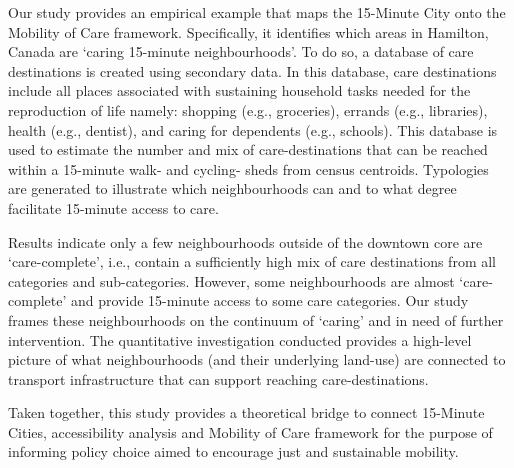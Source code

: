 \documentclass[
  authoryear,
  preprint,
  3p]{elsarticle}
\begin{document}
Our study provides an empirical example that maps the 15-Minute City
onto the Mobility of Care framework. Specifically, it identifies which
areas in Hamilton, Canada are `caring 15-minute neighbourhoods'. To do
so, a database of care destinations is created using secondary data. In
this database, care destinations include all places associated with
sustaining household tasks needed for the reproduction of life namely:
shopping (e.g., groceries), errands (e.g., libraries), health (e.g.,
dentist), and caring for dependents (e.g., schools). This database is
used to estimate the number and mix of care-destinations that can be
reached within a 15-minute walk- and cycling- sheds from census
centroids. Typologies are generated to illustrate which neighbourhoods
can and to what degree facilitate 15-minute access to care.

Results indicate only a few neighbourhoods outside of the downtown core
are `care-complete', i.e., contain a sufficiently high mix of care
destinations from all categories and sub-categories. However, some
neighbourhoods are almost `care-complete' and provide 15-minute access
to some care categories. Our study frames these neighbourhoods on the
continuum of `caring' and in need of further intervention. The
quantitative investigation conducted provides a high-level picture of
what neighbourhoods (and their underlying land-use) are connected to
transport infrastructure that can support reaching care-destinations.

Taken together, this study provides a theoretical bridge to connect
15-Minute Cities, accessibility analysis and Mobility of Care framework
for the purpose of informing policy choice aimed to encourage just and
sustainable mobility.


\renewcommand\refname{References}
  
\end{document}
